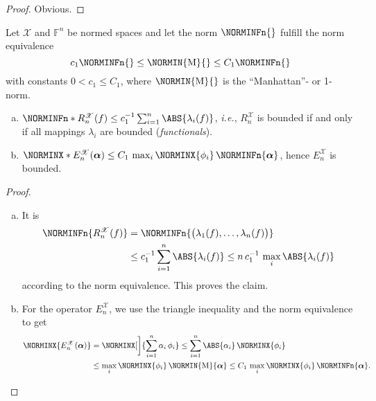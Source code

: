\documentclass[a4paper]{paper}
\newcommand*{\SPC}[1]{{\ensuremath{\mathscr{#1}}}}
\newcommand*{\SPCX}{\SPC{X}}
\newcommand{\FIELD}{{\ensuremath{\mathbb{F}}}}
\newcommand*{\Fn}{{\ensuremath{\FIELD^n}}}
\newcommand*{\EXT}[2]{\ensuremath{E_{#1}^{#2}}}
\newcommand*{\REST}[2]{\ensuremath{R_{#1}^{#2}}}
\newcommand*{\RnX}{{\ensuremath{\REST{n}{\SPC{X}}}}}
\newcommand*{\EnX}{{\ensuremath{\EXT{n}{\SPC{X}}}}}
\newcommand{\ie}{\textsl{i.e.}\xspace}
\newcommand{\valpha}{\boldsymbol{\alpha}}
\begin{document}
\begin{proof}
 Obvious.
\end{proof}


\begin{lemma}
 \label{lemma:specif:funct:op_prop_normedspace}
 Let $\SPCX$ and $\Fn$ be normed spaces and let the norm $\NORMINFn{}$ fulfill the norm equivalence
 \begin{equation*}
  c_1 \NORMINFn{} \leq \NORMIN{\mathrm{M}}{} \leq C_1 \NORMINFn{}
 \end{equation*}
 with constants $0 < c_1 \leq C_1$, where $\NORMIN{\mathrm{M}}{}$ is the ``Manhattan''- or 1-norm.

 \begin{enumerate}[(a)]
  \item \label{lemma:specif:funct:op_prop_normedspace:R_bounded}
  $\NORMINFn*{\RnX(f)} \leq c_1^{-1} \sum_{i=1}^n \ABS{\lambda_i(f)}$, \ie, $\RnX$ is bounded if and only if all 
  mappings $\lambda_i$ are bounded (\emph{functionals}).
  \item \label{lemma:specif:funct:op_prop_normedspace:E_bounded}
  $\NORMINX*{\EnX(\valpha)} \leq C_1\, \max_i \NORMINX{\phi_i}\, \NORMINFn{\valpha}$, hence $\EnX$ is bounded.
 \end{enumerate}
\end{lemma}
\vspace{1em}


\begin{proof}~
 \begin{enumerate}[(a)]
  \item It is
  \begin{align*}
   \NORMINFn{\RnX(f)} 
   &= \NORMINFn{\big( \lambda_1(f), \dots, \lambda_n(f) \big)} \\
   &\leq c_1^{-1} \sum_{i=1}^n \ABS{\lambda_i(f)} \leq n\,c_1^{-1}\, \max_i \ABS{\lambda_i(f)}
  \end{align*}
  according to the norm equivalence. This proves the claim.
  
  \item For the operator $\EnX$, we use the triangle inequality and the norm equivalence to get
  \begin{align*}
   \NORMINX{\EnX(\valpha)} 
   &= \NORMINX[\bigg]{\sum_{i=1}^n \alpha_i\, \phi_i} \leq \sum_{i=1}^n \ABS{\alpha_i}\, \NORMINX{\phi_i} \\
   &\leq \max_i \NORMINX{\phi_i}\, \NORMIN{\mathrm{M}}{\valpha} \leq C_1\, \max_i \NORMINX{\phi_i}\, 
   \NORMINFn{\valpha}.
  \end{align*}
 \end{enumerate}
\end{proof}
\end{document}
